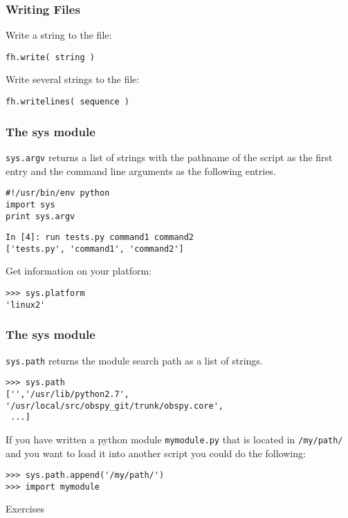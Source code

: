 \begin{frame}[fragile]
    \frametitle{Writing Files}
Write a string to the file:
    \begin{myColorBox}{0.9}{}
\begin{verbatim}
fh.write( string )
\end{verbatim}
    \end{myColorBox}
\pause
Write several strings to the file:
    \begin{myColorBox}{0.9}{}
\begin{verbatim}
fh.writelines( sequence )
\end{verbatim}
    \end{myColorBox}
\end{frame}

\begin{frame}[fragile]
\frametitle{The sys module}
\verb#sys.argv# returns a list of strings with the pathname of the script
as the first entry and the command line arguments as the following entries.
    \begin{myColorBox}{0.9}{}
    \begin{verbatim}
#!/usr/bin/env python
import sys
print sys.argv
    \end{verbatim}
    \end{myColorBox}
    \begin{myColorBox}{0.9}{}
    \begin{verbatim}
In [4]: run tests.py command1 command2
['tests.py', 'command1', 'command2']
    \end{verbatim}
    \end{myColorBox}
    \pause
Get information on your platform:
    \begin{myColorBox}{0.9}{}
    \begin{verbatim}
>>> sys.platform
'linux2'
    \end{verbatim}
    \end{myColorBox}
\end{frame}

\begin{frame}[fragile]
\frametitle{The sys module}
\verb#sys.path# returns the module search path as a list of strings. 
    \begin{myColorBox}{0.9}{}
    \begin{verbatim}
>>> sys.path
['','/usr/lib/python2.7', 
'/usr/local/src/obspy_git/trunk/obspy.core',
 ...]
    \end{verbatim}
    \end{myColorBox}
    \pause
If you have written a python module \verb#mymodule.py# that is located in
\verb#/my/path/# and you want to load it into another script you could do the
following:
    \begin{myColorBox}{0.9}{}
    \begin{verbatim}
>>> sys.path.append('/my/path/')
>>> import mymodule
    \end{verbatim}
    \end{myColorBox}
\end{frame}

\begin{frame}
\begin{center}
\Huge{Exercises}
\end{center}
\end{frame}
